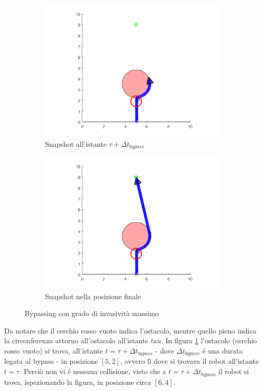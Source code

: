 \documentclass[14pt,a4paper]{extarticle}
\begin{document}
\begin{figure}[H]
\begin{subfigure}[b]{0.5\textwidth}
\end{subfigure}
\vfill
\begin{subfigure}[b]{0.5\textwidth}
\centering
\caption{Snapshot all'istante \(\tau+\Delta t_{bypass}\)}
\label{hmax2}
\includegraphics[width=\textwidth]{hmax_3.png}
\end{subfigure}
\hfill
\begin{subfigure}[b]{0.5\textwidth}
\centering
\caption{Snapshot nella posizione finale}
\includegraphics[width=\textwidth]{hmax_4.png}
\end{subfigure}
\caption{Bypassing con grado di invasività massimo}
\label{hmax}
\end{figure}
\begin{nota}
Da notare che il cerchio rosso vuoto indica l'ostacolo, mentre quello pieno indica la circonferenza attorno all'ostacolo all'istante \(tau\). In figura \ref{hmax2} l'ostacolo (cerchio rosso vuoto) si trova, all'istante \(t=\tau+\Delta t_{bypass}\) - dove \(\Delta t_{bypass}\) é una durata legata al bypass - in posizione \([5,2]\), ovvero lì dove si trovava il robot all'istante \(t=\tau\). Perciò non vi é nessuna collisione, visto che a \(t=\tau+\Delta t_{bypass}\) il robot si trova, ispezionando la figura, in posizione circa \([6,4]\).
\end{nota}
\end{document}
